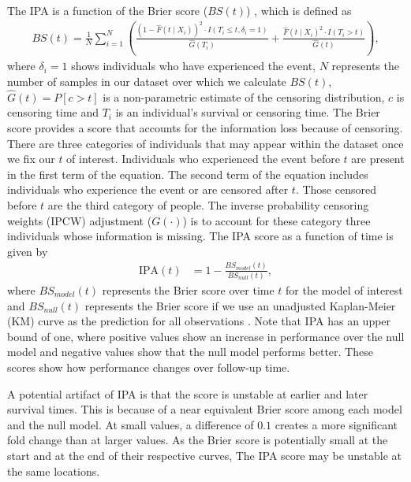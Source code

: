 \documentclass[AMA,STIX1COL,]{WileyNJD-v2}
\begin{document}
The IPA is a function of the Brier score (\(BS(t)\)) \citep{graf1999},
which is defined as \begin{align}
BS(t)=\frac{1}{N}\sum^{N}_{i=1}\left(\frac{\left(1 - \widehat{F}(t \mid X_{i})\right)^{2}\cdot I(T_{i}\leq t,\delta_{i}=1)}{\widehat{G}(T_{i})} + \frac{\widehat{F}(t\mid X_{i})^{2}\cdot I(T_{i}>t)}{\widehat{G}(t)}\right),
\end{align} where \(\delta_{i}=1\) shows individuals who have
experienced the event, \(N\) represents the number of samples in our
dataset over which we calculate \(BS(t)\), \(\widehat{G}(t)=P[c>t]\) is
a non-parametric estimate of the censoring distribution, \(c\) is
censoring time and \(T_{i}\) is an individual's survival or censoring
time. The Brier score provides a score that accounts for the information
loss because of censoring. There are three categories of individuals
that may appear within the dataset once we fix our \(t\) of interest.
Individuals who experienced the event before \(t\) are present in the
first term of the equation. The second term of the equation includes
individuals who experience the event or are censored after \(t\). Those
censored before \(t\) are the third category of people. The inverse
probability censoring weights (IPCW) adjustment (\(G(\cdot)\)) is to
account for these category three individuals whose information is
missing. The IPA score as a function of time is given by \begin{align}
\textrm{IPA}(t) &= 1-\frac{BS_{model}(t)}{BS_{null}(t)}, \nonumber
\end{align} where \(BS_{model}(t)\) represents the Brier score over time
\(t\) for the model of interest and \(BS_{null}(t)\) represents the
Brier score if we use an unadjusted Kaplan-Meier (KM) curve as the
prediction for all observations \citep{kattan2018index}. Note that IPA
has an upper bound of one, where positive values show an increase in
performance over the null model and negative values show that the null
model performs better. These scores show how performance changes over
follow-up time.

A potential artifact of IPA is that the score is unstable at earlier and
later survival times. This is because of a near equivalent Brier score
among each model and the null model. At small values, a difference of
\(0.1\) creates a more significant fold change than at larger values. As
the Brier score is potentially small at the start and at the end of
their respective curves, The IPA score may be unstable at the same
locations.
\end{document}
